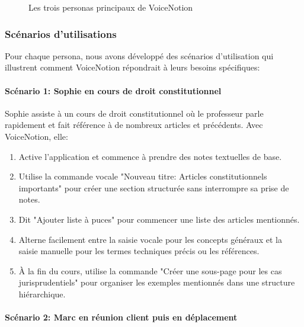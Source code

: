 \begin{figure}[H]
    \centering
    \caption{Les trois personas principaux de VoiceNotion}
    \label{fig:voicenotion_personas}
\end{figure}

\subsubsection{Scénarios d'utilisations}

Pour chaque persona, nous avons développé des scénarios d'utilisation qui illustrent comment VoiceNotion répondrait à leurs besoins spécifiques:

\paragraph{Scénario 1: Sophie en cours de droit constitutionnel}

Sophie assiste à un cours de droit constitutionnel où le professeur parle rapidement et fait référence à de nombreux articles et précédents. Avec VoiceNotion, elle:
\begin{enumerate}
    \item Active l'application et commence à prendre des notes textuelles de base.
    \item Utilise la commande vocale "Nouveau titre: Articles constitutionnels importants" pour créer une section structurée sans interrompre sa prise de notes.
    \item Dit "Ajouter liste à puces" pour commencer une liste des articles mentionnés.
    \item Alterne facilement entre la saisie vocale pour les concepts généraux et la saisie manuelle pour les termes techniques précis ou les références.
    \item À la fin du cours, utilise la commande "Créer une sous-page pour les cas jurisprudentiels" pour organiser les exemples mentionnés dans une structure hiérarchique.
\end{enumerate}

\paragraph{Scénario 2: Marc en réunion client puis en déplacement}

